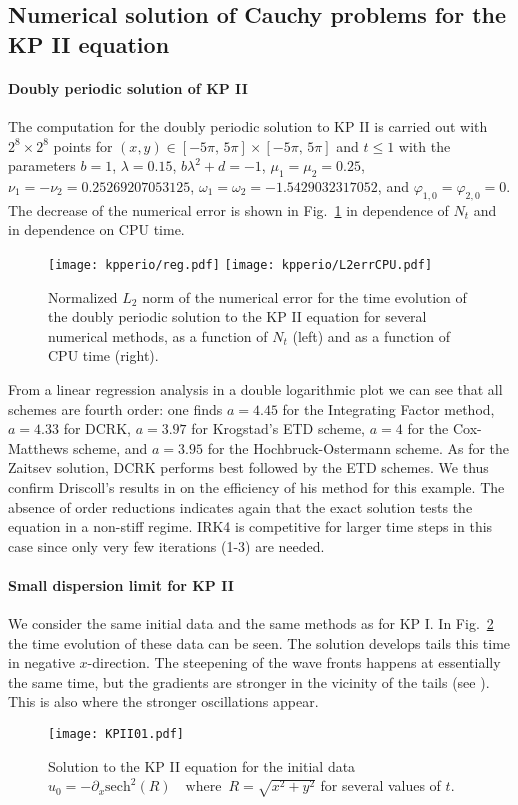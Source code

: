 \documentclass[final]{siamltex}
\begin{document}
\subsection{Numerical solution of Cauchy problems for the KP II equation}
\paragraph{Doubly periodic solution of KP II}

The computation for the doubly periodic solution to KP II 
is carried out with $2^{8}\times2^{8}$ points for $(x, y)\in[-5\pi,\,5\pi]\times[-5\pi,\,5\pi]$
and $t\leq1$ with the parameters $b = 1$, $\lambda = 0.15$, $b\lambda^{2}+d = -1$, $\mu_1 = \mu_2 = 0.25$, 
$ \nu_1 = -\nu_2 = 0.25269207053125$, $\omega_1 = \omega_2 = -1.5429032317052$,
and $\varphi_{1,0}=\varphi_{2,0} = 0$. 
The decrease of the numerical error is shown in 
Fig.~\ref{figperioreg} in dependence of $N_{t}$ and  in dependence on CPU time. 
\begin{figure}[htb!]
 \centering
\texttt{[image: kpperio/reg.pdf]}
\texttt{[image: kpperio/L2errCPU.pdf]}
  \caption{Normalized $L_{2}$ norm of the numerical error for the time 
 evolution of the doubly periodic solution to the KP II equation for several numerical
 methods, as a function of $N_{t}$  (left) and as a function of CPU 
 time (right).}
 \label{figperioreg}
\end{figure}
From a linear regression analysis in a double logarithmic plot we can see that all schemes are
fourth order: one finds $a=4.45$ for the Integrating Factor method, $a=4.33$ for DCRK, 
$a=3.97$ for Krogstad's ETD scheme, $a=4$ for the Cox-Matthews 
scheme, and $a=3.95$ for the Hochbruck-Ostermann scheme.
As for the Zaitsev solution, DCRK performs best followed 
by the ETD schemes. We thus confirm Driscoll's results in \cite{D} 
on the efficiency of his method for this example. The absence of order reductions indicates again 
that the exact solution tests the equation in a non-stiff regime. 
IRK4 is competitive for larger time steps in this case since only 
very few iterations (1-3) are needed.



\paragraph{Small dispersion limit for KP II}

We consider the same initial data and the same methods as for KP I. 
In Fig.~\ref{figKPII} the time evolution of these data can be seen. 
The solution develops tails this time in negative $x$-direction. The 
steepening of the wave fronts happens at essentially the same time, 
but the gradients are stronger in the vicinity of the tails (see 
\cite{KSM}). This is also where the stronger oscillations appear. 
\begin{figure}[htb!]
 \centering
 \texttt{[image: KPII01.pdf]}
 \caption{Solution to the KP II equation for the initial data $u_{0}=-\partial_{x}\mbox{sech}^{2}(R)\,\,\,\,\,\,
\mbox{where}\,\,\, R=\sqrt{x^{2}+y^{2}}$ for several values of $t$.}
    \label{figKPII}
\end{figure}
\end{document}
